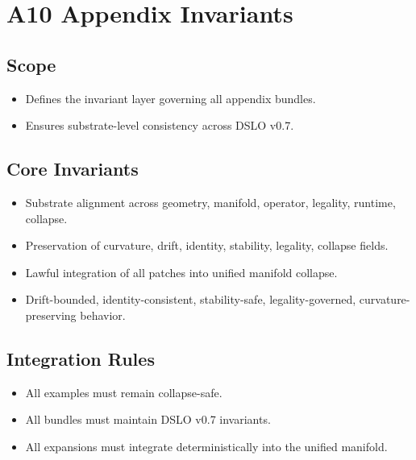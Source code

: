 \section{A10 Appendix Invariants}

\subsection{Scope}
\begin{itemize}
    \item Defines the invariant layer governing all appendix bundles.
    \item Ensures substrate-level consistency across DSLO v0.7.
\end{itemize}

\subsection{Core Invariants}
\begin{itemize}
    \item Substrate alignment across geometry, manifold, operator, legality, runtime, collapse.
    \item Preservation of curvature, drift, identity, stability, legality, collapse fields.
    \item Lawful integration of all patches into unified manifold collapse.
    \item Drift-bounded, identity-consistent, stability-safe, legality-governed, curvature-preserving behavior.
\end{itemize}

\subsection{Integration Rules}
\begin{itemize}
    \item All examples must remain collapse-safe.
    \item All bundles must maintain DSLO v0.7 invariants.
    \item All expansions must integrate deterministically into the unified manifold.
\end{itemize}
